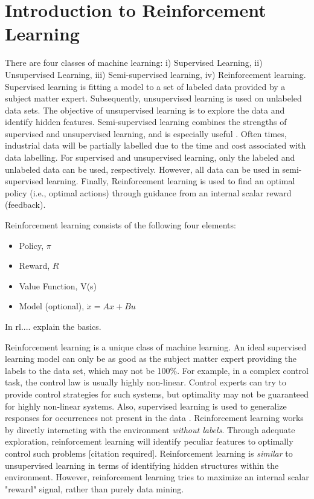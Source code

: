 \section{Introduction to Reinforcement Learning}

There are four classes of machine learning: i) Supervised Learning, ii) Unsupervised Learning, iii) Semi-supervised learning, iv) Reinforcement learning.  Supervised learning is fitting a model to a set of labeled data provided by a subject matter expert.  Subsequently, unsupervised learning is used on unlabeled data sets.  The objective of unsupervised learning is to explore the data and identify hidden features. Semi-supervised learning combines the strengths of supervised and unsupervised learning, and is especially useful \cite{machine_learning}.  Often times, industrial data will be partially labelled due to the time and cost associated with data labelling.  For supervised and unsupervised learning, only the labeled and unlabeled data can be used, respectively.  However, all data can be used in semi-supervised learning. Finally, Reinforcement learning is used to find an optimal policy (i.e., optimal actions) through guidance from an internal scalar reward (feedback).  

\medskip
Reinforcement learning consists of the following four elements:

\begin{itemize}
    \item Policy, $\pi$
    \item Reward, $R$
    \item Value Function, V(s)
    \item Model (optional), $\dot{x} = Ax + Bu$
\end{itemize}

In rl.... explain the basics.

\medskip
Reinforcement learning is a unique class of machine learning.  An ideal supervised learning model can only be as good as the subject matter expert providing the labels to the data set, which may not be 100\%.  For example, in a complex control task, the control law is usually highly non-linear. Control experts can try to provide control strategies for such systems, but optimality may not be guaranteed for highly non-linear systems. Also, supervised learning is used to generalize responses for occurrences not present in the data \cite{sutton}.  Reinforcement learning works by directly interacting with the environment \textit{without labels}. Through adequate exploration, reinforcement learning will identify peculiar features to optimally control such problems [citation required].  Reinforcement learning is \textit{similar} to unsupervised learning in terms of identifying hidden structures within the environment.  However, reinforcement learning tries to maximize an internal scalar "reward" signal, rather than purely data mining.

